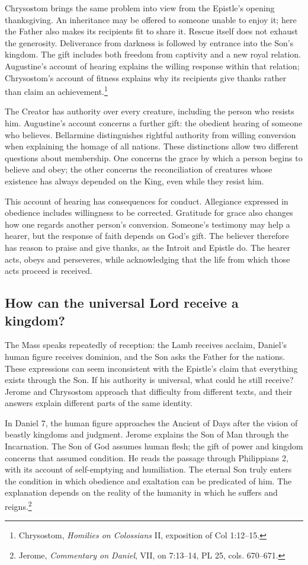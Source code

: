 Chrysostom brings the same problem into view from the Epistle's opening thanksgiving. An inheritance may be offered to someone unable to enjoy it; here the Father also makes its recipients fit to share it. Rescue itself does not exhaust the generosity. Deliverance from darkness is followed by entrance into the Son's kingdom. The gift includes both freedom from captivity and a new royal relation. Augustine's account of hearing explains the willing response within that relation; Chrysostom's account of fitness explains why its recipients give thanks rather than claim an achievement.\footnote{Chrysostom, \emph{Homilies on Colossians} II, exposition of Col 1:12--15.}

The Creator has authority over every creature, including the person who resists him. Augustine's account concerns a further gift: the obedient hearing of someone who believes. Bellarmine distinguishes rightful authority from willing conversion when explaining the homage of all nations. These distinctions allow two different questions about membership. One concerns the grace by which a person begins to believe and obey; the other concerns the reconciliation of creatures whose existence has always depended on the King, even while they resist him.

This account of hearing has consequences for conduct. Allegiance expressed in obedience includes willingness to be corrected. Gratitude for grace also changes how one regards another person's conversion. Someone's testimony may help a hearer, but the response of faith depends on God's gift. The believer therefore has reason to praise and give thanks, as the Introit and Epistle do. The hearer acts, obeys and perseveres, while acknowledging that the life from which those acts proceed is received.

\subsection{How can the universal Lord receive a kingdom?}
The Mass speaks repeatedly of reception: the Lamb receives acclaim, Daniel's human figure receives dominion, and the Son asks the Father for the nations. These expressions can seem inconsistent with the Epistle's claim that everything exists through the Son. If his authority is universal, what could he still receive? Jerome and Chrysostom approach that difficulty from different texts, and their answers explain different parts of the same identity.

In Daniel 7, the human figure approaches the Ancient of Days after the vision of beastly kingdoms and judgment. Jerome explains the Son of Man through the Incarnation. The Son of God assumes human flesh; the gift of power and kingdom concerns that assumed condition. He reads the passage through Philippians 2, with its account of self-emptying and humiliation. The eternal Son truly enters the condition in which obedience and exaltation can be predicated of him. The explanation depends on the reality of the humanity in which he suffers and reigns.\footnote{Jerome, \emph{Commentary on Daniel}, VII, on 7:13--14, PL 25, cols. 670--671.}

